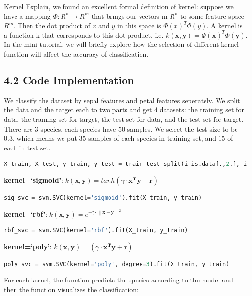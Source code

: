 \documentclass[12pt]{article}
\begin{document}
\href{https://stats.stackexchange.com/questions/152897/how-to-intuitively-explain-what-a-kernel-is}{Kernel Explain}, we found an excellent formal definition of kernel: suppose we have a mapping $\Phi:R^n \rightarrow R^m$ that brings our vectors in $R^n$ to some feature space $R^m$. Then the dot product of $x$ and $y$ in this space is $\Phi(x)^T \Phi(y)$. 
A kernel is a function k that corresponds to this dot product, i.e. $k(\mathbf{x},\mathbf{y}) = \Phi(\mathbf{x})^T \Phi(\mathbf{y})$. In the mini tutorial, we will briefly explore how the selection of different kernel function will affect the accuracy of classification.

\subsection*{4.2 Code Implementation}
We classify the dataset by sepal features and petal features seperately. We split the data and the target each to two parts and get 4 datasets: the training set for data, the training set for target, the test set for data, and the test set for target. There are 3 species, each species have 50 samples. We select the test size to be 0.3, which means 
we put 35 samples of each species in training set, and 15 of each in test set. \\
\begin{lstlisting}[language=Python, caption=Train Test Split]
X_train, X_test, y_train, y_test = train_test_split(iris.data[:,2:], iris.target, test_size=0.3, random_state=0)  #[:,2:]
\end{lstlisting}
\textbf{kernel=`sigmoid'}: $k(\mathbf{x},\mathbf{y}) = tanh(\gamma \cdot \mathbf{x^T}\mathbf{y}+\mathbf{r})$ 
\begin{lstlisting}[language=Python, caption=Sigmoid]
sig_svc = svm.SVC(kernel='sigmoid').fit(X_train, y_train)
\end{lstlisting}
\textbf{kernel=`rbf'}: $k(\mathbf{x},\mathbf{y}) = e^{-\gamma \cdot \left\|\mathbf{x}-\mathbf{y}\right\|^2}$ 
\begin{lstlisting}[language=Python, caption=RBF]
rbf_svc = svm.SVC(kernel='rbf').fit(X_train, y_train)
\end{lstlisting}
\textbf{kernel=`poly'}: $k(\mathbf{x},\mathbf{y}) = (\gamma \cdot \mathbf{x^T y} + \mathbf{r})$
\begin{lstlisting}[language=Python, caption=Poly]
poly_svc = svm.SVC(kernel='poly', degree=3).fit(X_train, y_train)
\end{lstlisting}
For each kernel, the function predicts the species according to the model and then the function visualizes the classification: 
\end{document}
